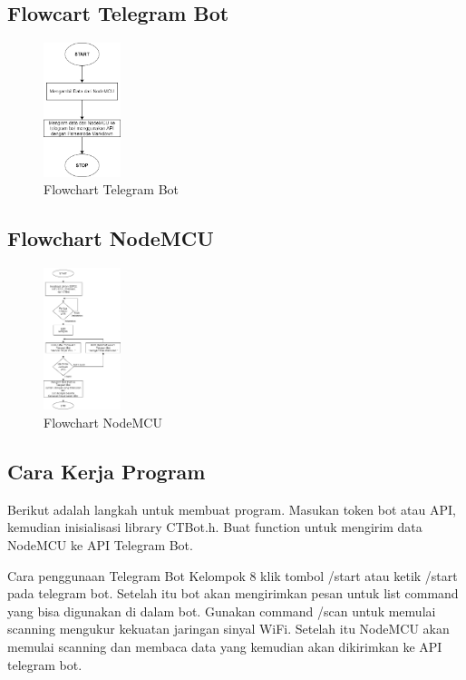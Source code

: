 \documentclass[conference]{IEEEtran}
\begin{document}
\subsection{Flowcart Telegram Bot}
\begin{figure}[h]
    \centering
    \includegraphics[width=0.2\textwidth]{Flowchart telegram bot.png}
    \caption{Flowchart Telegram Bot}
\end{figure}
\vspace{1cm}

\subsection{Flowchart NodeMCU}
\begin{figure}[h]
    \centering
    \includegraphics[width=0.2\textwidth]{Flowchart NodeMCU telegram bot.png}
    \caption{Flowchart NodeMCU}
\end{figure}
\vspace{1cm}
\subsection{Cara Kerja Program}
Berikut adalah langkah untuk membuat program. Masukan token bot atau API, kemudian inisialisasi library CTBot.h. Buat function untuk mengirim data NodeMCU ke API Telegram Bot.

Cara penggunaan Telegram Bot Kelompok 8 klik tombol /start atau ketik /start pada telegram bot. Setelah itu bot akan mengirimkan pesan untuk list command yang bisa digunakan di dalam bot.
Gunakan command /scan untuk memulai scanning mengukur kekuatan jaringan sinyal WiFi.
Setelah itu NodeMCU akan memulai scanning dan membaca data yang kemudian akan dikirimkan ke API telegram bot.
\end{document}
